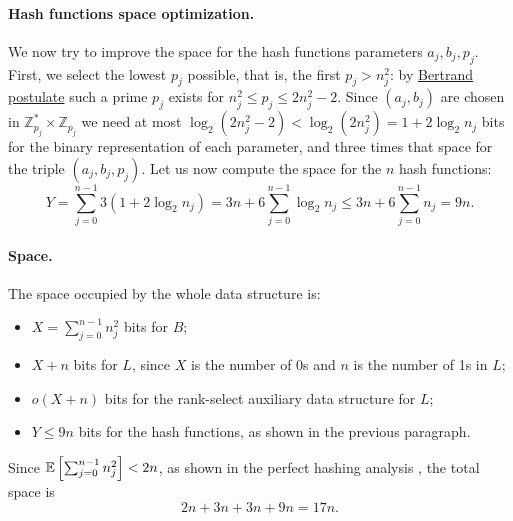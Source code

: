 \paragraph{Hash functions space optimization.} We now try to improve the space for the hash functions parameters $a_j, b_j, p_j$. First, we select the lowest $p_j$ possible, that is, the first $p_j > n_j^2$: by \href{https://en.wikipedia.org/wiki/Bertrand\%27s_postulate}{Bertrand postulate} such a prime $p_j$ exists for $n_j^2 \leq p_j \leq 2n_j^2 - 2$. Since $(a_j, b_j)$ are chosen in $\mathbb{Z}_{p_j}^* \times \mathbb{Z}_{p_j}$ we need at most $\log_2 (2n_j^2-2) < \log_2 (2n_j^2) = 1 + 2\log_2 n_j$ bits for the binary representation of each parameter, and three times that space for the triple $(a_j, b_j, p_j)$. Let us now compute the space for the $n$ hash functions:
\begin{equation*}
  Y = \sum_{j=0}^{n-1} 3{(1 + 2\log_2 n_j)}
    = 3n + 6\sum_{j=0}^{n-1} \log_2 n_j
    \leq 3n + 6\sum_{j=0}^{n-1} n_j = 9n.
\end{equation*}

\paragraph{Space.} The space occupied by the whole data structure is:
\begin{itemize}
  \item $X = \sum_{j=0}^{n-1}n_j^2$ bits for $B$;
  \item $X + n$ bits for $L$, since $X$ is the number of 0s and $n$ is the number of 1s in $L$;
  \item $o(X + n)$ bits for the rank-select auxiliary data structure for $L$;
  \item $Y \leq 9n$ bits for the hash functions, as shown in the previous paragraph.
\end{itemize}
Since $\mathbb{E}\left[{\sum_{j=0}^{n-1}n_j^2}\right] < 2n$, as shown in the perfect hashing analysis \cite[281]{Cormen09}, the total space is 
$$2n + 3n + 3n + 9n = 17n.$$
